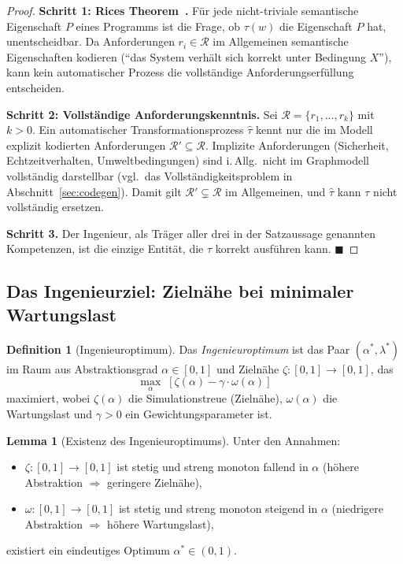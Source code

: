 ﻿\documentclass[a4paper,12pt]{article}
\theoremstyle{definition}
\newtheorem{definition}{Definition}
\newtheorem{lemma}{Lemma}
\begin{document}
\begin{proof}
\textbf{Schritt 1: Rices Theorem~\cite{rice1953}.}
Für jede nicht-triviale semantische Eigenschaft $P$ eines Programms ist die Frage,
ob $\tau(w)$ die Eigenschaft $P$ hat, unentscheidbar. Da Anforderungen
$r_i \in \mathcal{R}$ im Allgemeinen semantische Eigenschaften kodieren
(\enquote{das System verhält sich korrekt unter Bedingung $X$}), kann kein
automatischer Prozess die vollständige Anforderungserfüllung entscheiden.

\textbf{Schritt 2: Vollständige Anforderungskenntnis.}
Sei $\mathcal{R} = \{r_1, \ldots, r_k\}$ mit $k > 0$.
Ein automatischer Transformationsprozess $\hat{\tau}$ kennt nur die im Modell
explizit kodierten Anforderungen $\mathcal{R}' \subseteq \mathcal{R}$.
Implizite Anforderungen (Sicherheit, Echtzeitverhalten, Umweltbedingungen) sind
i.\,Allg.\ nicht im Graphmodell vollständig darstellbar (vgl.\ das Vollständigkeitsproblem
in Abschnitt~\ref{sec:codegen}).
Damit gilt $\mathcal{R}' \subsetneq \mathcal{R}$ im Allgemeinen, und
$\hat{\tau}$ kann $\tau$ nicht vollständig ersetzen.

\textbf{Schritt 3.}
Der Ingenieur, als Träger aller drei in der Satzaussage genannten Kompetenzen,
ist die einzige Entität, die $\tau$ korrekt ausführen kann. $\blacksquare$
\end{proof}

\subsection{Das Ingenieurziel: Zielnähe bei minimaler Wartungslast}

\begin{definition}[Ingenieuroptimum]
\label{def:ingopt}
Das \emph{Ingenieuroptimum} ist das Paar $(\alpha^*, \lambda^*)$ im Raum aus
Abstraktionsgrad $\alpha \in [0,1]$ und Zielnähe $\zeta: [0,1] \to [0,1]$, das
\[
  \max_\alpha \;\left[\zeta(\alpha) - \gamma \cdot \omega(\alpha)\right]
\]
maximiert, wobei $\zeta(\alpha)$ die Simulationstreue (Zielnähe), $\omega(\alpha)$ die
Wartungslast und $\gamma > 0$ ein Gewichtungsparameter ist.
\end{definition}

\begin{lemma}[Existenz des Ingenieuroptimums]
\label{lem:ingopt}
Unter den Annahmen:
\begin{itemize}
  \item $\zeta: [0,1] \to [0,1]$ ist stetig und streng monoton fallend in $\alpha$
        (höhere Abstraktion $\Rightarrow$ geringere Zielnähe),
  \item $\omega: [0,1] \to [0,1]$ ist stetig und streng monoton steigend in $\alpha$
        (niedrigere Abstraktion $\Rightarrow$ höhere Wartungslast),
\end{itemize}
existiert ein eindeutiges Optimum $\alpha^* \in (0,1)$.
\end{lemma}
\end{document}
